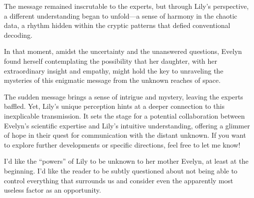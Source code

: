 \begin{aquote}
    The message remained inscrutable to the experts, but through Lily's perspective, a different understanding began to unfold—a sense of harmony in the chaotic data, a rhythm hidden within the cryptic patterns that defied conventional decoding.

    In that moment, amidst the uncertainty and the unanswered questions, Evelyn found herself contemplating the possibility that her daughter, with her extraordinary insight and empathy, might hold the key to unraveling the mysteries of this enigmatic message from the unknown reaches of space.\medskip

    The sudden message brings a sense of intrigue and mystery, leaving the experts baffled. Yet, Lily's unique perception hints at a deeper connection to this inexplicable transmission. It sets the stage for a potential collaboration between Evelyn's scientific expertise and Lily's intuitive understanding, offering a glimmer of hope in their quest for communication with the distant unknown. If you want to explore further developments or specific directions, feel free to let me know!
\end{aquote}

\begin{qquote}
    I'd like the ``powers'' of Lily to be unknown to her mother Evelyn, at least at the beginning. I'd like the reader to be subtly questioned about not being able to control everything that surrounds us and consider even the apparently most useless factor as an opportunity.
\end{qquote}

